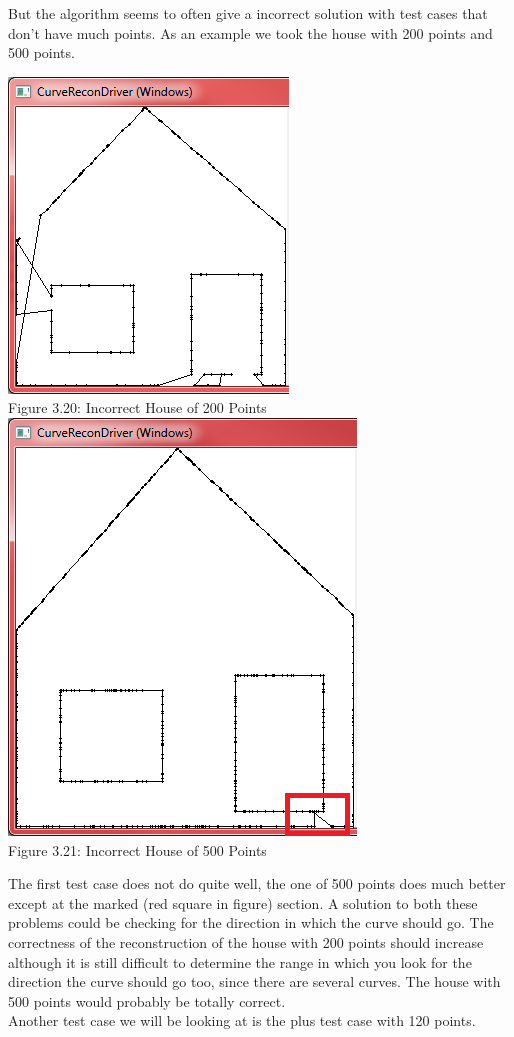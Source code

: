     But the algorithm seems to often give a incorrect solution with test cases that don't have much points.
    As an example we took the house with 200 points and 500 points.\\
    \begin{center}
        \includegraphics[scale = 0.6]{4UpToFiveSort/utfsHouse200.png}\\
        \label{fig:utfs_incorrecthouse200}
        Figure 3.20: Incorrect House of 200 Points
        \includegraphics[scale = 0.5]{4UpToFiveSort/utfsHouse500.png}
        \label{fig:utfs_incorrecthouse500}\\
        Figure 3.21: Incorrect House of 500 Points
    \end{center}
    The first test case does not do quite well, the one of 500 points does much better except at the marked (red square in figure) section. A solution to both these problems could be checking for the direction in which the curve should go. The correctness of the reconstruction of the house with 200 points should increase although it is still difficult to determine the range in which you look for the direction the curve should go too, since there are several curves. The house with 500 points would probably be totally correct.\\
    Another test case we will be looking at is the plus test case with 120 points.

